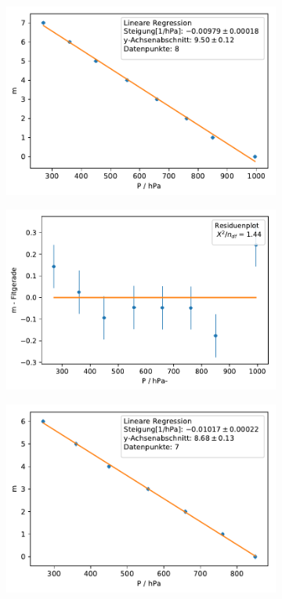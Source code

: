 \documentclass[12pt,a4paper]{article}
\begin{document}
\begin{figure}[H]
	\centering
	\begin{subfigure}{0.49\textwidth}
		\centering
		\includegraphics[width=\textwidth]{Python/MR2_LinReg_Rohdaten.pdf}
	\end{subfigure}
	\begin{subfigure}{0.49\textwidth}
		\centering
		\includegraphics[width=\textwidth]{Python/MR2_Residuen_Rohdaten.pdf}
	\end{subfigure}
	\begin{subfigure}{0.49\textwidth}
		\centering
		\includegraphics[width=\textwidth]{Python/MR2_LinReg.pdf}

\end{subfigure}
\end{figure}
\end{document}
